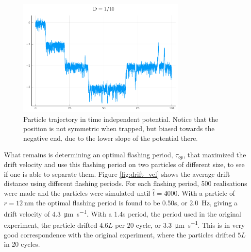 \documentclass[a4paper, 12pt]{article}
\begin{document}
\begin{figure}[ht]
\centering
\includegraphics[width=0.75\textwidth]{media/particle_trajectory}
\caption{Particle trajectory in time independent potential.
Notice that the position is not symmetric when trapped, but biased towards the negative end, due to the lower slope of the potential there.\label{fig:traj}}
\end{figure}


What remains is determining an optimal flashing period, $\tau_{op}$, that maximized the drift velocity and use this flashing period on two particles of different size, to see if one is able to separate them.
Figure \ref{fig:drift_vel} shows the average drift distance using different flashing periods.
For each flashing period, 500 realisations were made and the particles were simulated until $\hat{t} = 4000$.
With a particle of $r=\SI{12}{\nano\meter}$ the optimal flashing period is found to be 0.50s, or \SI{2.0}{\hertz}, giving a drift velocity of \SI{4.3}{\micro\meter\per\second}.
With a 1.4s period, the period used in the original experiment, the particle drifted $4.6L$ per 20 cycle, or \SI{3.3}{\micro\meter\per\second}.
This is in very good correspondence with the original experiment, where the particles drifted $5L$ in 20 cycles.
\end{document}
